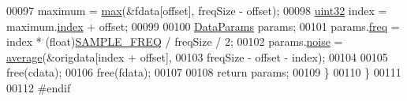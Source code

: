 \begin{DoxyCode}
00097         maximum = \hyperlink{namespaceavda_aa82021c3ee552773c060b1a39caf8aaa}{max}(&fdata[offset], freqSize - offset);
00098         \hyperlink{definitions_8hpp_a1134b580f8da4de94ca6b1de4d37975e}{uint32} index = maximum.\hyperlink{structMaximum_a2e6aef03795cd285fe542d0861c6e3b5}{index} + offset;
00099         
00100         \hyperlink{structDataParams}{DataParams} params;
00101         params.\hyperlink{structDataParams_a12566e017407647bc8287d62554ad3fb}{freq} = index * (float)\hyperlink{definitions_8hpp_a8ace559345ecba7978591ac2ef22aea4}{SAMPLE\_FREQ} / freqSize / 2;
00102         params.\hyperlink{structDataParams_a4efd1d2231c6fa7c878c9d5e1650738f}{noise} = \hyperlink{namespaceavda_a2a830f24a59aa2538ea82f6e000cce61}{average}(&origdata[index + offset],
00103                 freqSize - offset - index);
00104 
00105         free(cdata);
00106         free(fdata);
00107 
00108         \textcolor{keywordflow}{return} params;
00109     \}
00110 \}
00111 
00112 \textcolor{preprocessor}{#endif}
\end{DoxyCode}
